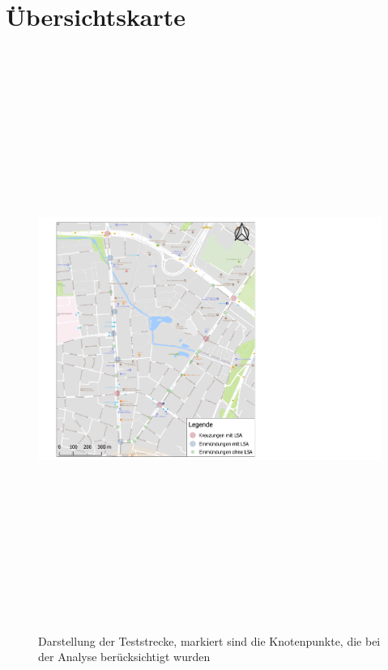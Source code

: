 
\chapter{Übersichtskarte}\label{chapter:Übersichtskarten}


\begin{savenotes}
	\begin{figure}[H]
		\centering
		\includegraphics[width=24cm,height=19cm]{figures/Markante_Punkte}
		\caption[Darstellung der Teststrecke, markiert sind die Knotenpunkte, die bei der Analyse berücksichtigt wurden]{Darstellung der Teststrecke, markiert sind die Knotenpunkte, die bei der Analyse berücksichtigt wurden}\label{fig:Knoten_Testgebiet}
	\end{figure}
\end{savenotes}